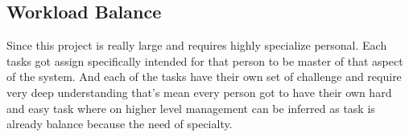 \subsection{Workload Balance}
\label{subsec:workload-balance}
    Since this project is really large and requires highly specialize personal.
    Each tasks got assign specifically intended for that person to be master of that aspect of the system.
    And each of the tasks have their own set of challenge and require very deep understanding that's mean
    every person got to have their own hard and easy task where on higher level management can be inferred
    as task is already balance because the need of specialty.
